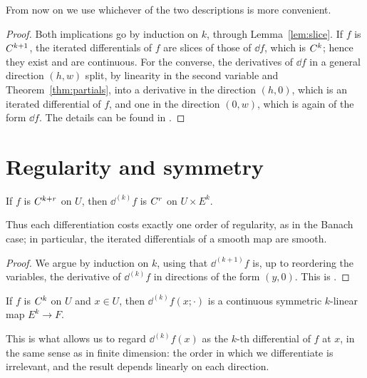 From now on we use whichever of the two descriptions is more convenient.

\begin{proof}
  \leanok
  Both implications go by induction on $k$, through Lemma~\ref{lem:slice}. If $f$ is
  $C^{k+1}$, the iterated differentials of $f$ are slices of those of $\dd f$, which is
  $C^{k}$; hence they exist and are continuous. For the converse, the derivatives of $\dd f$
  in a general direction $(h, w)$ split, by linearity in the second variable and
  Theorem~\ref{thm:partials}, into a derivative in the direction $(h, 0)$, which is an iterated
  differential of $f$, and one in the direction $(0, w)$, which is again of the form $\dd f$.
  The details can be found in \cite[1.3.10 and 1.3.12]{GN26}.
\end{proof}

\section{Regularity and symmetry}

\begin{theorem}
  \label{thm:iterated-regular}
  \leanok
  If $f$ is $C^{k + r}$ on $U$, then $\dd^{(k)} f$ is $C^{r}$ on $U \times E^k$.
\end{theorem}

Thus each differentiation costs exactly one order of regularity, as in the Banach case; in
particular, the iterated differentials of a smooth map are smooth.

\begin{proof}
  \leanok
  We argue by induction on $k$, using that $\dd^{(k+1)} f$ is, up to reordering the variables,
  the derivative of $\dd^{(k)} f$ in directions of the form $(y, 0)$. This is \cite[1.3.13]{GN26}.
\end{proof}

\begin{theorem}[Schwarz]
  \label{thm:schwarz}
  \leanok
  If $f$ is $C^{k}$ on $U$ and $x \in U$, then $\dd^{(k)} f(x; \cdot)$ is a continuous
  symmetric $k$-linear map $E^k \to F$.
\end{theorem}

This is what allows us to regard $\dd^{(k)} f(x)$ as the $k$-th differential of $f$ at $x$, in
the same sense as in finite dimension: the order in which we differentiate is irrelevant, and
the result depends linearly on each direction.

